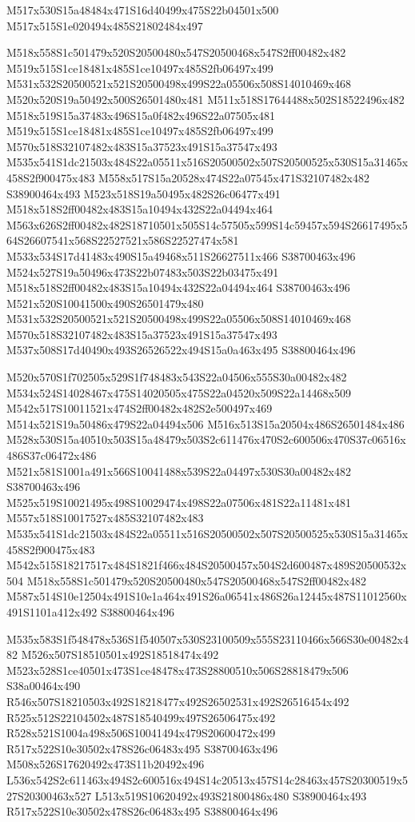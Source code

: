 \documentclass{article}
\begin{document}
\begin{multicols}{2}
\begin{center}
M517x530S15a48484x471S16d40499x475S22b04501x500 M517x515S1e020494x485S21802484x497 
\end{center}


M518x558S1c501479x520S20500480x547S20500468x547S2ff00482x482 M519x515S1ce18481x485S1ce10497x485S2fb06497x499 M531x532S20500521x521S20500498x499S22a05506x508S14010469x468 M520x520S19a50492x500S26501480x481 M511x518S17644488x502S18522496x482 M518x519S15a37483x496S15a0f482x496S22a07505x481 M519x515S1ce18481x485S1ce10497x485S2fb06497x499 M570x518S32107482x483S15a37523x491S15a37547x493 M535x541S1dc21503x484S22a05511x516S20500502x507S20500525x530S15a31465x458S2f900475x483 M558x517S15a20528x474S22a07545x471S32107482x482 S38900464x493 M523x518S19a50495x482S26c06477x491 M518x518S2ff00482x483S15a10494x432S22a04494x464 M563x626S2ff00482x482S18710501x505S14c57505x599S14c59457x594S26617495x564S26607541x568S22527521x586S22527474x581 M533x534S17d41483x490S15a49468x511S26627511x466 S38700463x496 M524x527S19a50496x473S22b07483x503S22b03475x491 M518x518S2ff00482x483S15a10494x432S22a04494x464 S38700463x496 M521x520S10041500x490S26501479x480 M531x532S20500521x521S20500498x499S22a05506x508S14010469x468 M570x518S32107482x483S15a37523x491S15a37547x493 M537x508S17d40490x493S26526522x494S15a0a463x495 S38800464x496

M520x570S1f702505x529S1f748483x543S22a04506x555S30a00482x482 M534x524S14028467x475S14020505x475S22a04520x509S22a14468x509 M542x517S10011521x474S2ff00482x482S2e500497x469 M514x521S19a50486x479S22a04494x506 M516x513S15a20504x486S26501484x486 M528x530S15a40510x503S15a48479x503S2c611476x470S2c600506x470S37c06516x486S37c06472x486 M521x581S1001a491x566S10041488x539S22a04497x530S30a00482x482 S38700463x496 M525x519S10021495x498S10029474x498S22a07506x481S22a11481x481 M557x518S10017527x485S32107482x483 M535x541S1dc21503x484S22a05511x516S20500502x507S20500525x530S15a31465x458S2f900475x483 M542x515S18217517x484S1821f466x484S20500457x504S2d600487x489S20500532x504 M518x558S1c501479x520S20500480x547S20500468x547S2ff00482x482 M587x514S10e12504x491S10e1a464x491S26a06541x486S26a12445x487S11012560x491S1101a412x492 S38800464x496

M535x583S1f548478x536S1f540507x530S23100509x555S23110466x566S30e00482x482 M526x507S18510501x492S18518474x492 M523x528S1ce40501x473S1ce48478x473S28800510x506S28818479x506 S38a00464x490 R546x507S18210503x492S18218477x492S26502531x492S26516454x492 R525x512S22104502x487S18540499x497S26506475x492 R528x521S1004a498x506S10041494x479S20600472x499 R517x522S10e30502x478S26c06483x495 S38700463x496 M508x526S17620492x473S11b20492x496 L536x542S2c611463x494S2c600516x494S14c20513x457S14c28463x457S20300519x527S20300463x527 L513x519S10620492x493S21800486x480 S38900464x493 R517x522S10e30502x478S26c06483x495 S38800464x496


\end{multicols}
\end{document}
